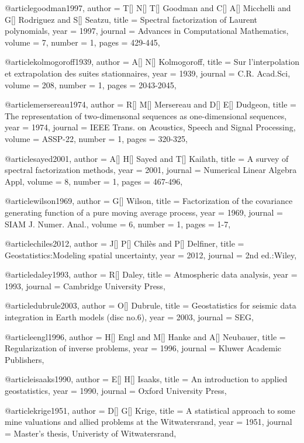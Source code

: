 {@article{goodman1997,
  author =	 {T[] N[] T[] Goodman and C[] A[] Micchelli and G[] Rodriguez and S[] Seatzu},
  title =	 {Spectral factorization of Laurent polynomials},
  year =	 1997,
  journal =	 {Advances in Computational Mathematics},
  volume =	 7,
  number =	 1,
  pages =	 {429-445},
}

@article{kolmogoroff1939,
  author =	 {A[] N[] Kolmogoroff},
  title =	 {Sur l'interpolation et extrapolation des suites stationnaires},
  year =	 1939,
  journal =	 {C.R. Acad.Sci},
  volume =	 208,
  number =	 1,
  pages =	 {2043-2045},
}

@article{mersereau1974,
  author =	 {R[] M[] Mersereau and D[] E[] Dudgeon},
  title =	 {The representation of two-dimensonal sequences as one-dimensional sequences},
  year =	 1974,
  journal =	 {IEEE Trans. on Acoustics, Speech and Signal Processing},
  volume =	 ASSP-22,
  number =	 1,
  pages =	 {320-325},
}

@article{sayed2001,
  author =	 {A[] H[] Sayed and T[] Kailath},
  title =	 {A survey of spectral factorization methods},
  year =	 2001,
  journal =	 {Numerical Linear Algebra Appl},
  volume =	 8,
  number =	 1,
  pages =	 {467-496},
}

@article{wilson1969,
  author =	 {G[] Wilson},
  title =	 {Factorization of the covariance generating function of a pure moving average process},
  year =	 1969,
  journal =	 {SIAM J. Numer. Anal.},
  volume =	 6,
  number =	 1,
  pages =	 {1-7},
}

@article{chiles2012,
  author =	 {J[] P[] Chil\`{e}s and P[] Delfiner},
  title =	 {Geostatistics:Modeling spatial uncertainty},
  year =	 2012,
  journal =	 {2nd ed.:Wiley},
}

@article{daley1993,
  author =	 {R[] Daley},
  title =	 {Atmospheric data analysis},
  year =	 1993,
  journal =	 {Cambridge University Press},
}

@article{dubrule2003,
  author =	 {O[] Dubrule},
  title =	 {Geostatistics for seismic data integration in Earth models (disc no.6)},
  year =	 2003,
  journal =	 {SEG},
}

@article{engl1996,
  author =	 {H[] Engl and M[] Hanke and A[] Neubauer},
  title =	 {Regularization of inverse problems},
  year =	 1996,
  journal =	 {Kluwer Academic Publishers},
}

@article{isaaks1990,
  author =	 {E[] H[] Isaaks},
  title =	 {An introduction to applied geostatistics},
  year =	 1990,
  journal =	 {Oxford University Press},
}

@article{krige1951,
  author =	 {D[] G[] Krige},
  title =	 {A statistical approach to some mine valuations and allied problems at the Witwatersrand},
  year =	 1951,
  journal =	 {Master's thesis, Univeristy of Witwatersrand},
}

}
